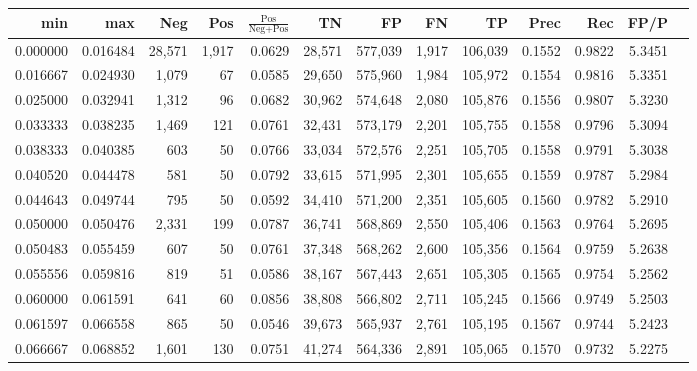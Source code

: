 \begin{tabular}{rrrrrrrrrrrrr}
\toprule
     min &      max &    Neg &   Pos & $\frac{\text{Pos}}{\text{Neg}+\text{Pos}}$ &      TN &      FP &      FN &      TP &   Prec &    Rec &   FP/P \\
\midrule
0.000000 & 0.016484 & 28,571 & 1,917 &                                     0.0629 &  28,571 & 577,039 &   1,917 & 106,039 & 0.1552 & 0.9822 & 5.3451 \\
0.016667 & 0.024930 &  1,079 &    67 &                                     0.0585 &  29,650 & 575,960 &   1,984 & 105,972 & 0.1554 & 0.9816 & 5.3351 \\
0.025000 & 0.032941 &  1,312 &    96 &                                     0.0682 &  30,962 & 574,648 &   2,080 & 105,876 & 0.1556 & 0.9807 & 5.3230 \\
0.033333 & 0.038235 &  1,469 &   121 &                                     0.0761 &  32,431 & 573,179 &   2,201 & 105,755 & 0.1558 & 0.9796 & 5.3094 \\
0.038333 & 0.040385 &    603 &    50 &                                     0.0766 &  33,034 & 572,576 &   2,251 & 105,705 & 0.1558 & 0.9791 & 5.3038 \\
0.040520 & 0.044478 &    581 &    50 &                                     0.0792 &  33,615 & 571,995 &   2,301 & 105,655 & 0.1559 & 0.9787 & 5.2984 \\
0.044643 & 0.049744 &    795 &    50 &                                     0.0592 &  34,410 & 571,200 &   2,351 & 105,605 & 0.1560 & 0.9782 & 5.2910 \\
0.050000 & 0.050476 &  2,331 &   199 &                                     0.0787 &  36,741 & 568,869 &   2,550 & 105,406 & 0.1563 & 0.9764 & 5.2695 \\
0.050483 & 0.055459 &    607 &    50 &                                     0.0761 &  37,348 & 568,262 &   2,600 & 105,356 & 0.1564 & 0.9759 & 5.2638 \\
0.055556 & 0.059816 &    819 &    51 &                                     0.0586 &  38,167 & 567,443 &   2,651 & 105,305 & 0.1565 & 0.9754 & 5.2562 \\
0.060000 & 0.061591 &    641 &    60 &                                     0.0856 &  38,808 & 566,802 &   2,711 & 105,245 & 0.1566 & 0.9749 & 5.2503 \\
0.061597 & 0.066558 &    865 &    50 &                                     0.0546 &  39,673 & 565,937 &   2,761 & 105,195 & 0.1567 & 0.9744 & 5.2423 \\
0.066667 & 0.068852 &  1,601 &   130 &                                     0.0751 &  41,274 & 564,336 &   2,891 & 105,065 & 0.1570 & 0.9732 & 5.2275 \\

\end{tabular}
